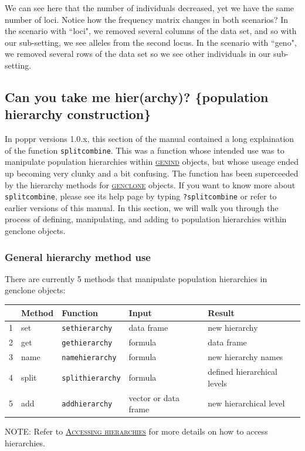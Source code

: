 \documentclass[letterpaper]{article}\usepackage[]{graphicx}\usepackage[]{color}
\newcommand{\tab}{\hspace*{1em}}
\newcommand{\seclink}[2]{
  \textsc{\hyperref[#1]{#2}}
}
\begin{document}
We can see here that the number of individuals decreased, yet we have the same number of loci. Notice how the frequency matrix changes in both scenarios? In the scenario with ``loci", we removed several columns of the data set, and so with our sub-setting, we see alleles from the second locus. In the scenario with ``geno", we removed several rows of the data set so we see other individuals in our sub-setting.
%
\subsection{Can you take me hier(archy)? \{population hierarchy construction\}}
\label{data.manip:hier}

\tab\tab In poppr versions 1.0.x, this section of the manual contained a long
explaination of the function \texttt{splitcombine}.
This was a function whose intended use was to manipulate population hierarchies
within\seclink{intro:genind}{genind}objects, but whose useage ended up becoming 
very clunky and a bit confusing. The function has been superceeded by the hierarchy methods for\seclink{intro:genclone}{genclone}objects. If you want to know more about \texttt{splitcombine}, please see its
help page by typing \texttt{?splitcombine} or refer to earlier versions of this
manual. In this section, we will walk you through the process of defining, 
manipulating, and adding to population hierarchies within genclone objects. 

\subsubsection{General hierarchy method use}
\label{data.manip:hier:method}

\tab\tab There are currently 5 methods that manipulate population hierarchies in
genclone objects:

\begin{table}[ht]
\centering
\begin{tabular}{rllll}
  \hline
 & Method & Function & Input & Result\\ 
  \hline
  1 & set & \texttt{sethierarchy} & data frame & new hierarchy\\ 
  2 & get & \texttt{gethierarchy} & formula & data frame\\ 
  3 & name & \texttt{namehierarchy} & formula & new hierarchy names\\ 
  4 & split & \texttt{splithierarchy} & formula & defined hierarchical levels\\ 
  5 & add & \texttt{addhierarchy} & vector or data frame & new hierarchical level\\
   \hline
\end{tabular}
\end{table}
\noindent
NOTE: Refer to\seclink{intro:genclone:access}{Accessing hierarchies}for more
details on how to access hierarchies.\\
\end{document}
